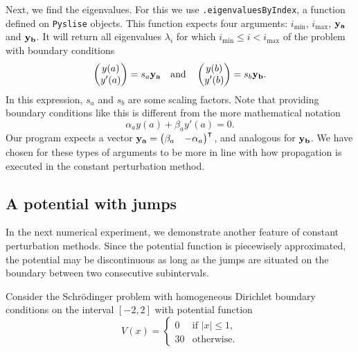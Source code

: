 Next, we find the eigenvalues. For this we use \texttt{.eigenvaluesByIndex}, a function defined on \texttt{Pyslise} objects. This function expects four arguments: $i_\text{min}$, $i_\text{max}$, $\vb{y_a}$ and $\vb{y_b}$. It will return all eigenvalues $\lambda_i$ for which $i_\text{min} \leq i < i_\text{max}$ of the problem with boundary conditions
$$
    \begin{pmatrix}y(a) \\ y'(a)\end{pmatrix} = s_a \vb{y_a} \quad\text{and}\quad \begin{pmatrix}y(b) \\ y'(b)\end{pmatrix} = s_b \vb{y_b}\text{.}
$$
In this expression, $s_a$ and $s_b$ are some scaling factors. Note that providing boundary conditions like this is different from the more mathematical notation
$$
    \alpha_a y(a) + \beta_a y'(a) = 0\text{.}
$$
Our program expects a vector $\vb{y_a} = \begin{pmatrix}\beta_a & - \alpha_a\end{pmatrix}^\intercal{}$, and analogous for $\vb{y_b}$. We have chosen for these types of arguments to be more in line with how propagation is executed in the constant perturbation method.

\subsection{A potential with jumps}\label{sec:c2_experiment_with_jumps}

In the next numerical experiment, we demonstrate another feature of constant perturbation methods. Since the potential function is piecewisely approximated, the potential may be discontinuous as long as the jumps are situated on the boundary between two consecutive subintervals.

Consider the Schrödinger problem with homogeneous Dirichlet boundary conditions on the interval $[-2, 2]$ with potential function
\begin{equation}\label{equ:c2_matslise_jumps_well}
    V(x) = \begin{cases}
        0  & \text{if $|x| \leq 1$,} \\
        30 & \text{otherwise.}
    \end{cases}
\end{equation}

